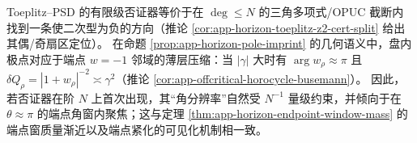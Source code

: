 \begin{remark}\label{rem:app-horizon-toeplitz-witness-endpoint-focus}
Toeplitz--PSD 的有限级否证器等价于在 \(\deg\le N\) 的三角多项式/OPUC 截断内找到一条使二次型为负的方向（推论 \ref{cor:app-horizon-toeplitz-z2-cert-split} 给出其偶/奇扇区定位）。
在命题 \ref{prop:app-horizon-pole-imprint} 的几何语义中，盘内极点对应于端点 \(w=-1\) 邻域的薄层压缩：当 \(|\gamma|\) 大时有 \(\arg w_\rho\approx\pi\) 且 \(\delta Q_\rho=|1+w_\rho|^{-2}\asymp \gamma^2\)（推论 \ref{cor:app-offcritical-horocycle-busemann}）。
因此，若否证器在阶 \(N\) 上首次出现，其“角分辨率”自然受 \(N^{-1}\) 量级约束，并倾向于在 \(\theta\approx\pi\) 的端点角窗内聚焦；这与定理 \ref{thm:app-horizon-endpoint-window-mass} 的端点窗质量渐近以及端点紧化的可见化机制相一致。
\end{remark}

\endinput

